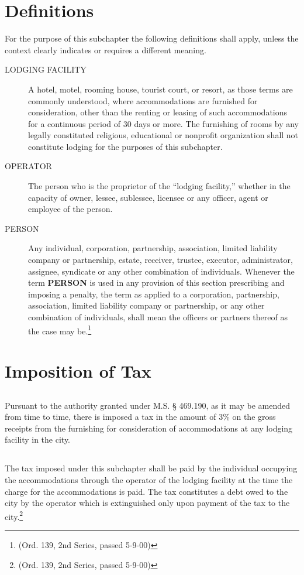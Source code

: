 \section{Definitions}
For the purpose of this subchapter the following definitions shall apply, unless the context clearly indicates or requires a different meaning.
\begin{description}
    \item[LODGING FACILITY] A hotel, motel, rooming house, tourist court, or resort, as those terms are commonly understood, where accommodations are furnished for consideration, other than the renting or leasing of such accommodations for a continuous period of 30 days or more.  The furnishing of rooms by any legally constituted religious, educational or nonprofit organization shall not constitute lodging for the purposes of this subchapter.
    \item[OPERATOR] The person who is the proprietor of the “lodging facility,” whether in the capacity of owner, lessee, sublessee, licensee or any officer, agent or employee of the person.
    \item[PERSON] Any individual, corporation, partnership, association, limited liability company or partnership, estate, receiver, trustee, executor, administrator, assignee, syndicate or any other combination of individuals.  Whenever the term \textbf{PERSON} is used in any provision of this section prescribing and imposing a penalty, the term as applied to a corporation, partnership, association, limited liability company or partnership, or any other combination of individuals, shall mean the officers or partners thereof as the case may be.\footnote{(Ord. 139, 2nd Series, passed 5-9-00)}
\end{description}

\section{Imposition of Tax}
\subsection{}
Pursuant to the authority granted under M.S. § 469.190, as it may be amended from time to time, there is imposed a tax in the amount of 3\% on the gross receipts from the furnishing for consideration of accommodations at any lodging facility in the city.
\subsection{}
The tax imposed under this subchapter shall be paid by the individual occupying the accommodations through the operator of the lodging facility at the time the charge for the accommodations is paid.  The tax constitutes a debt owed to the city by the operator which is extinguished only upon payment of the tax to the city.\footnote{(Ord. 139, 2nd Series, passed 5-9-00)}

